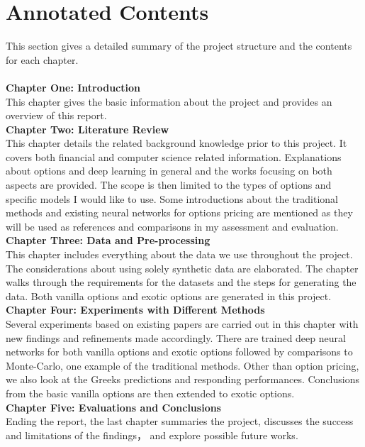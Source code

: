 \documentclass{report}
\begin{document}
\section{Annotated Contents}
This section gives a detailed summary of the project structure and the contents for each chapter.\\\\
\textbf{Chapter One: Introduction}\\
This chapter gives the basic information about the project and provides an overview of this report.\\
\textbf{Chapter Two: Literature Review}\\
This chapter details the related background knowledge prior to this project. It covers both financial and computer science related information. Explanations about options and deep learning in general and the works focusing on both aspects are provided. The scope is then limited to the types of options and specific models I would like to use. Some introductions about the traditional methods and existing neural networks for options pricing are mentioned as they will be used as references and comparisons in my assessment and evaluation.\\
\textbf{Chapter Three: Data and Pre-processing}\\
This chapter includes everything about the data we use throughout the project. The considerations about using solely synthetic data are elaborated. The chapter walks through the requirements for the datasets and the steps for generating the data. Both vanilla options and exotic options are generated in this project.\\
\textbf{Chapter Four: Experiments with Different Methods}\\
Several experiments based on existing papers are carried out in this chapter with new findings and refinements made accordingly. There are trained deep neural networks for both vanilla options and exotic options followed by comparisons to Monte-Carlo, one example of the traditional methods. Other than option pricing, we also look at the Greeks predictions and responding performances. Conclusions from the basic vanilla options are then extended to exotic options.\\
\textbf{Chapter Five: Evaluations and Conclusions}\\
Ending the report, the last chapter summaries the project, discusses the success and limitations of the findings， and explore possible future works.\\
\end{document}
